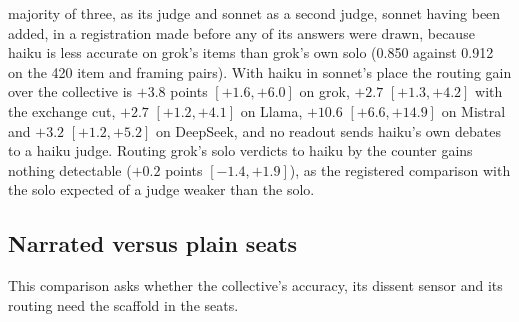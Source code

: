 majority of three, as its judge and sonnet as a second judge, sonnet having
been added, in a registration made before any of its answers were drawn,
because haiku is less accurate on grok's items than grok's own solo (0.850
against 0.912 on the 420 item and framing pairs). With haiku in sonnet's
place the routing gain over the collective is $+3.8$ points $[+1.6, +6.0]$ on
grok, $+2.7$ $[+1.3, +4.2]$ with the exchange cut, $+2.7$ $[+1.2, +4.1]$ on
Llama, $+10.6$ $[+6.6, +14.9]$ on Mistral and $+3.2$ $[+1.2, +5.2]$ on
DeepSeek, and no readout sends haiku's own debates to a haiku judge. Routing
grok's solo verdicts to haiku by the counter gains nothing detectable
($+0.2$ points $[-1.4, +1.9]$), as the registered comparison with the solo
expected of a judge weaker than the solo.

\subsection{Narrated versus plain seats}
\label{app-seat}

This comparison asks whether the collective's accuracy, its dissent sensor
and its routing need the scaffold in the seats.

